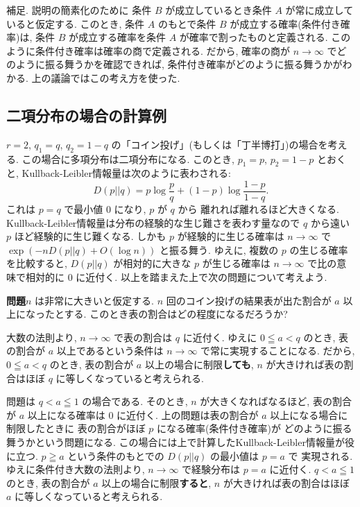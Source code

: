 \documentclass[12pt,twoside]{jarticle}
\theoremstyle{definition} %
\theoremstyle{definition} %
\theoremstyle{definition} %
\numberwithin{theorem}{section}
\numberwithin{equation}{section}
\numberwithin{figure}{section}
\numberwithin{table}{section}
\begin{document}
補足. 説明の簡素化のために
条件 $B$ が成立しているとき条件 $A$ が常に成立していると仮定する.
このとき, 条件 $A$ のもとで条件 $B$ が成立する確率(条件付き確率)は, 
条件 $B$ が成立する確率を条件 $A$ が確率で割ったものと定義される.
このように条件付き確率は確率の商で定義される.
だから, 確率の商が $n\to\infty$ でどのように振る舞うかを確認できれば,
条件付き確率がどのように振る舞うかがわかる. 
上の議論ではこの考え方を使った.


\subsection{二項分布の場合の計算例}
\label{sec:binom-Sanov}

$r=2$, $q_1=q$, $q_2=1-q$ の「コイン投げ」(もしくは「丁半博打」)の場合を考える.
この場合に多項分布は二項分布になる.
このとき, $p_1=p$, $p_2=1-p$ とおくと, 
Kullback-Leibler情報量は次のように表わされる:
\[
D(p||q)=p\log \frac{p}{q}+(1-p)\log\frac{1-p}{1-q}. 
\]
これは $p=q$ で最小値 $0$ になり, $p$ が $q$ から
離れれば離れるほど大きくなる.
Kullback-Leibler情報量は分布の経験的な生じ難さを表わす量なので
$q$ から遠い $p$ ほど経験的に生じ難くなる.
しかも $p$ が経験的に生じる確率は $n\to\infty$ で
$\exp(-nD(p||q)+O(\log n))$ と振る舞う.
ゆえに, 複数の $p$ の生じる確率を比較すると, 
$D(p||q)$ が相対的に大きな $p$ が生じる確率は
$n\to\infty$ で比の意味で相対的に $0$ に近付く. 
以上を踏まえた上で次の問題について考えよう.

\medskip

{\bf 問題}\enspace $n$ は非常に大きいと仮定する.
$n$ 回のコイン投げの結果表が出た割合が $a$ 以上になったとする.
このとき表の割合はどの程度になるだろうか?

\medskip

大数の法則より, $n\to\infty$ で表の割合は $q$ に近付く.
ゆえに $0\leqq a<q$ のとき, 表の割合が $a$ 以上であるという条件は
$n\to\infty$ で常に実現することになる.
だから, $0\leqq a<q$ のとき, 表の割合が $a$ 以上の場合に制限{\bf しても}, 
$n$ が大きければ表の割合はほぼ $q$ に等しくなっていると考えられる.

問題は $q<a\leqq 1$ の場合である. 
そのとき, $n$ が大きくなればなるほど, 
表の割合が $a$ 以上になる確率は $0$ に近付く.  
上の問題は表の割合が $a$ 以上になる場合に制限したときに
表の割合がほぼ $p$ になる確率(条件付き確率)が
どのように振る舞うかという問題になる.
この場合には上で計算したKullback-Leibler情報量が役に立つ.
$p\geqq a$ という条件のもとでの $D(p||q)$ の最小値は $p=a$ で
実現される. ゆえに条件付き大数の法則より, 
$n\to\infty$ で経験分布は $p=a$ に近付く.
$q<a\leqq 1$ のとき, 表の割合が $a$ 以上の場合に制限{\bf すると}, 
$n$ が大きければ表の割合はほぼ $a$ に等しくなっていると考えられる.
\end{document}
